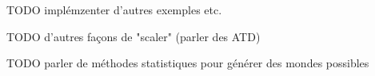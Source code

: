 
TODO implémzenter d'autres exemples etc.


TODO d'autres façons de "scaler" (parler des ATD)

TODO parler de méthodes statistiques pour générer des mondes possibles